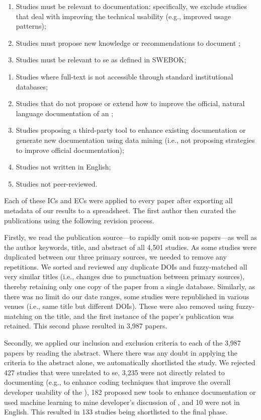 \begin{enumerate}[leftmargin=2\parindent,label=\textbf{IC\arabic*}]
  \item Studies must be relevant to  documentation: specifically, we exclude studies that deal with improving the technical  usability (e.g., improved usage patterns);
  \item Studies must propose new knowledge or recommendations to document ;
  \item Studies must be relevant to \gls{se} as defined in SWEBOK;
\end{enumerate}
\begin{enumerate}[leftmargin=2\parindent,label=\textbf{EC\arabic*}]
  \item Studies where full-text is not accessible through standard institutional databases; 
  \item Studies that do not propose or extend how to improve the official, natural language documentation of an ;
  \item Studies proposing a third-party tool to enhance existing documentation or generate new documentation using data mining (i.e., not proposing strategies to improve official documentation);
  \item Studies not written in English;
  \item Studies not peer-reviewed.
\end{enumerate}
\smallskip

Each of these ICs and ECs were applied to every paper  after exporting all  metadata of our results to a spreadsheet. The first author then curated the publications using the following revision process.

Firstly, we read the publication source---to rapidly omit non-\gls{se} papers---as well as the author keywords, title, and abstract of all 4,501 studies. As some studies were duplicated between our three primary sources, we needed to remove any repetitions. We sorted and reviewed any duplicate DOIs and fuzzy-matched all very similar titles (i.e., changes due to punctuation between primary sources), thereby retaining only one copy of the paper from a single database. Similarly, as there was no limit do our date ranges, some studies were republished in various venues (i.e., same title but different DOIs). These were also removed using fuzzy-matching on the title, and the first instance of the paper's publication was retained. This second phase resulted in 3,987 papers.

Secondly, we applied our inclusion and exclusion criteria to each of the 3,987 papers by reading the abstract. Where there was any doubt in applying the criteria to the abstract alone, we automatically shortlisted the study. We rejected 427 studies that were unrelated to \gls{se}, 3,235 were not directly related to documenting  (e.g., to enhance coding techniques that improve the overall developer usability of the ), 182 proposed new tools to enhance  documentation or used machine learning to mine developer's discussion of , and 10 were not in English. This resulted in 133 studies being shortlisted to the final phase.

